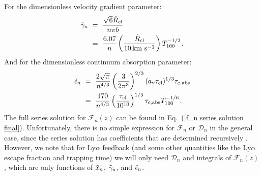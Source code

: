 \documentclass[fleqn,usenatbib]{mnras}
\newcommand{\taucl}{\tau_{\rm cl}}
\begin{document}
For the dimensionless velocity gradient parameter:
\begin{align}
     \Tilde{\gamma}_n ~&=~ \dfrac{\sqrt{6}\Dot{R}_{\rm cl}}{n \pi b }  \nonumber \\  ~&=~ \dfrac{6.07}{n} \left( \dfrac{\Dot{R}_{\rm cl}}{10\,\rm km ~ s^{-1}} \right) T_{100}^{-1/2} \hspace{1 pt} \label{gammatilde expression}.
\end{align}
And for the dimensionless continuum absorption parameter:
\begin{align}
    \Tilde{\epsilon}_n ~&=~ \dfrac{2\sqrt{\pi}}{n^{4/3}} \left( \dfrac{3}{2 \pi^3} \right)^{2/3}   (a_{\rm v}\taucl)^{1/3} \tau_{\rm c, abs}  \nonumber \\ ~&=~ \dfrac{170}{n^{4/3}} \left(\dfrac{\taucl}{10^{10}}\right)^{1/3} \tau_{\rm c, abs} T_{100}^{-1/6} \hspace{1 pt} \label{epsilontilde expression}.
\end{align}
The full series solution for $\mathcal{F}_n(z)$ can be found in Eq.~(\ref{f_n series solution final}). Unfortunately, there is no simple expression for $\mathcal{F}_n$ or $\mathcal{D}_n$ in the general case, since the series solution has coefficients that are determined recursively \citep[as in the series solution found by][]{Neufeld1990}. However, we note that for Ly$\alpha$ feedback (and some other quantities like the Ly$\alpha$ escape fraction and trapping time) we will only need  $\mathcal{D}_n$ and integrals of $\mathcal{F}_n(z)$, which are only functions of $\Tilde{x}_n$, $\Tilde{\gamma}_n$, and $\Tilde{\epsilon}_n$. 
\end{document}
